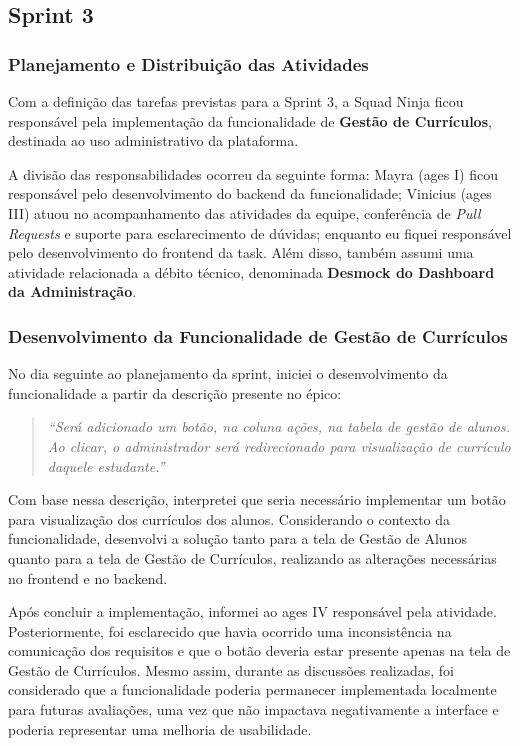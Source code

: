 \subsection{Sprint 3}

\subsubsection*{Planejamento e Distribuição das Atividades}

Com a definição das tarefas previstas para a Sprint 3, a Squad Ninja ficou responsável
pela implementação da funcionalidade de \textbf{Gestão de Currículos}, destinada ao
uso administrativo da plataforma.

A divisão das responsabilidades ocorreu da seguinte forma: Mayra (\ac{ages} I) ficou
responsável pelo desenvolvimento do backend da funcionalidade; Vinicius (\ac{ages} III)
atuou no acompanhamento das atividades da equipe, conferência de \textit{Pull Requests}
e suporte para esclarecimento de dúvidas; enquanto eu fiquei responsável pelo
desenvolvimento do frontend da task. Além disso, também assumi uma atividade
relacionada a débito técnico, denominada \textbf{Desmock do Dashboard da Administração}.

\subsubsection*{Desenvolvimento da Funcionalidade de Gestão de Currículos}

No dia seguinte ao planejamento da sprint, iniciei o desenvolvimento da funcionalidade
a partir da descrição presente no épico:

\begin{quotation}
\itshape
``Será adicionado um botão, na coluna ações, na tabela de gestão de alunos. Ao clicar,
o administrador será redirecionado para visualização de currículo daquele estudante.''
\end{quotation}

Com base nessa descrição, interpretei que seria necessário implementar um botão para
visualização dos currículos dos alunos. Considerando o contexto da funcionalidade,
desenvolvi a solução tanto para a tela de Gestão de Alunos quanto para a tela de Gestão
de Currículos, realizando as alterações necessárias no frontend e no backend.

Após concluir a implementação, informei ao \ac{ages} IV responsável pela atividade.
Posteriormente, foi esclarecido que havia ocorrido uma inconsistência na comunicação
dos requisitos e que o botão deveria estar presente apenas na tela de Gestão de
Currículos. Mesmo assim, durante as discussões realizadas, foi considerado que a
funcionalidade poderia permanecer implementada localmente para futuras avaliações,
uma vez que não impactava negativamente a interface e poderia representar uma melhoria
de usabilidade.

